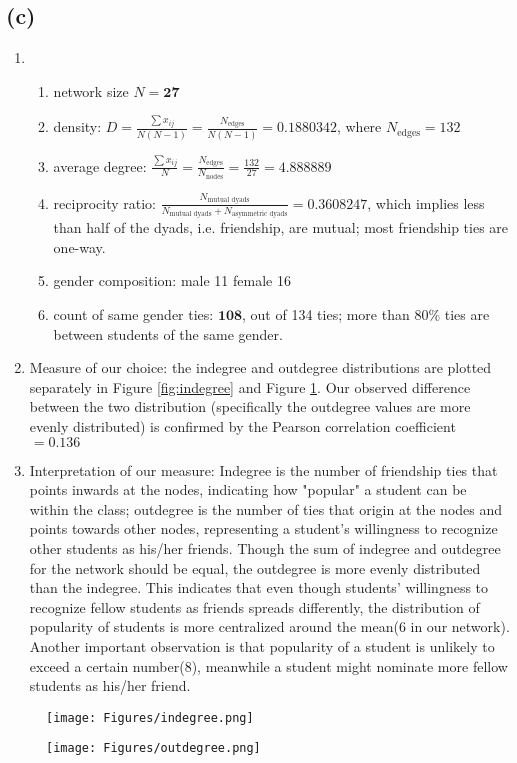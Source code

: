 \documentclass[11pt]{article}
\begin{document}
\subsection*{(c)}
\begin{enumerate}
\item 
\begin{enumerate}
\item network size $N = \mathbf{27}$
\item density: $D = \frac{\sum x_{ij}}{N(N-1)} 
= \frac{N_{\text{edges}}}{N(N-1)} = \mathbf{0.1880342}$,
where $N_\text{edges} = 132$
\item average degree: $\frac{\sum x_{ij}}{N} =\frac{N_\text{edges}}{N_\text{nodes}}= \frac{132}{27} = \mathbf{4.888889}$
\item reciprocity ratio: 
$\frac{N_{\text{mutual dyads}}}{N_{\text{mutual dyads}} + N_{\text{asymmetric dyads}}} = \mathbf{0.3608247}$, which implies less than half of the dyads, i.e. friendship, are mutual; most friendship ties are one-way. 
\item gender composition: male 11 female 16
\item count of same gender ties: $\mathbf{108}$, out of 134 ties; more than 80$\%$ ties are between students of the same gender.
\end{enumerate}
\item 
Measure of our choice: the indegree and outdegree distributions are plotted separately in Figure \ref{fig:indegree} and Figure \ref{fig:outdegree}. Our observed difference between the two distribution (specifically the outdegree values are more evenly distributed) is confirmed by the Pearson correlation coefficient $= \mathbf{0.136}$
\item
Interpretation of our measure: Indegree is the number of friendship ties that points inwards at the nodes, indicating how "popular" a student can be within the class; outdegree is the number of ties that origin at the nodes and points towards other nodes, representing a student's willingness to recognize other students as his/her friends. Though the sum of indegree and outdegree for the network should be equal, the outdegree is more evenly distributed than the indegree. This indicates that even though students' willingness to recognize fellow students as friends spreads differently, the distribution of popularity of students is more centralized around the mean($6$ in our network). Another important observation is that popularity of a student is unlikely to exceed a certain number($8$), meanwhile a student might nominate more fellow students as his/her friend.
\end{enumerate}
\begin{figure}
\centering
\begin{minipage}{.5\textwidth}
  \centering
  \texttt{[image: Figures/indegree.png]}
  \label{fig:indegree}
\end{minipage}%
\begin{minipage}{.5\textwidth}
  \centering
  \texttt{[image: Figures/outdegree.png]}
  \label{fig:outdegree}
\end{minipage}
\end{figure}
\end{document}

